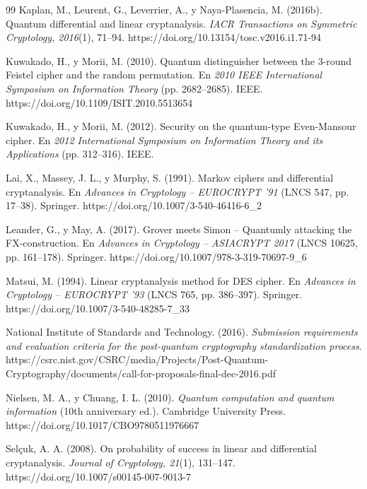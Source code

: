 \begin{thebibliography}{99}
Kaplan, M., Leurent, G., Leverrier, A., y Naya-Plasencia, M. (2016b). Quantum differential and linear cryptanalysis. \emph{IACR Transactions on Symmetric Cryptology, 2016}(1), 71--94. https://doi.org/10.13154/tosc.v2016.i1.71-94

Kuwakado, H., y Morii, M. (2010). Quantum distinguisher between the 3-round Feistel cipher and the random permutation. En \emph{2010 IEEE International Symposium on Information Theory} (pp. 2682--2685). IEEE. https://doi.org/10.1109/ISIT.2010.5513654

Kuwakado, H., y Morii, M. (2012). Security on the quantum-type Even-Mansour cipher. En \emph{2012 International Symposium on Information Theory and its Applications} (pp. 312--316). IEEE.

Lai, X., Massey, J. L., y Murphy, S. (1991). Markov ciphers and differential cryptanalysis. En \emph{Advances in Cryptology -- EUROCRYPT '91} (LNCS 547, pp. 17--38). Springer. https://doi.org/10.1007/3-540-46416-6\_2

Leander, G., y May, A. (2017). Grover meets Simon -- Quantumly attacking the FX-construction. En \emph{Advances in Cryptology -- ASIACRYPT 2017} (LNCS 10625, pp. 161--178). Springer. https://doi.org/10.1007/978-3-319-70697-9\_6

Matsui, M. (1994). Linear cryptanalysis method for DES cipher. En \emph{Advances in Cryptology -- EUROCRYPT '93} (LNCS 765, pp. 386--397). Springer. https://doi.org/10.1007/3-540-48285-7\_33

National Institute of Standards and Technology. (2016). \emph{Submission requirements and evaluation criteria for the post-quantum cryptography standardization process}. https://csrc.nist.gov/CSRC/media/Projects/Post-Quantum-Cryptography/documents/call-for-proposals-final-dec-2016.pdf

Nielsen, M. A., y Chuang, I. L. (2010). \emph{Quantum computation and quantum information} (10th anniversary ed.). Cambridge University Press. https://doi.org/10.1017/CBO9780511976667

Selçuk, A. A. (2008). On probability of success in linear and differential cryptanalysis. \emph{Journal of Cryptology, 21}(1), 131--147. https://doi.org/10.1007/s00145-007-9013-7


\end{thebibliography}
